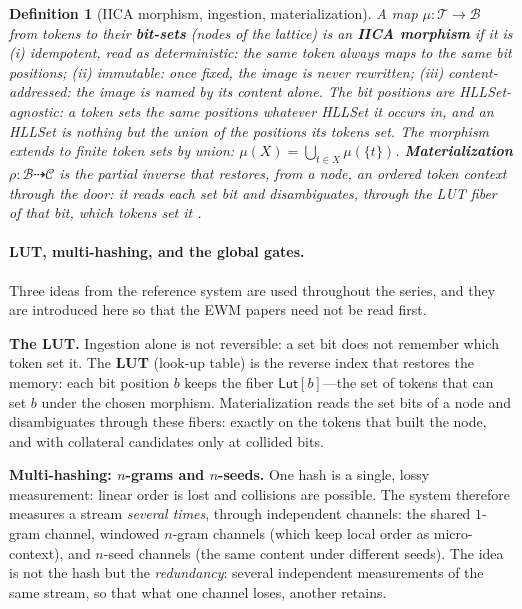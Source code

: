 \documentclass[11pt,a4paper]{article}
\newtheorem{definition}[principle]{Definition}
\theoremstyle{remark}
\newcommand{\Lat}{\ensuremath{\mathcal{B}}}              %
\newcommand{\Tok}{\ensuremath{\mathcal{T}}}              %
\newcommand{\Ctx}{\ensuremath{\mathcal{C}}}              %
\newcommand{\Ing}{\ensuremath{\mu}}                      %
\newcommand{\Mat}{\ensuremath{\rho}}                     %
\newcommand{\Lut}{\ensuremath{\mathsf{Lut}}}             %
\begin{document}
\begin{definition}[IICA morphism, ingestion, materialization]
\label{def:iica}
A map $\Ing : \Tok \to \Lat$ from tokens to their \textbf{bit-sets} (nodes of
the lattice) is an \textbf{IICA
morphism} if it is (i) \emph{idempotent}, read as deterministic: the same token
always maps to the same bit positions; (ii) \emph{immutable}: once fixed, the
image is never rewritten; (iii) \emph{content-addressed}: the image is named by
its content alone. The bit positions are \emph{HLLSet-agnostic}: a token sets
the same positions whatever HLLSet it occurs in, and an HLLSet is nothing but
the union of the positions its tokens set. The morphism extends to finite
token sets by union:
$\Ing(X) = \bigcup_{t \in X} \Ing(\{t\})$. \textbf{Materialization}
$\Mat : \Lat \dashrightarrow \Ctx$ is the partial inverse that restores, from a
node, an ordered token context through the door: it reads each set bit and
disambiguates, through the LUT fiber of that bit, which tokens set it
\cite{attention2026}.
\end{definition}

\paragraph{LUT, multi-hashing, and the global gates.}
Three ideas from the reference system are used throughout the series, and
they are introduced here so that the EWM papers need not be read first.

\textbf{The LUT.} Ingestion alone is not reversible: a set bit does not
remember which token set it. The \textbf{LUT} (look-up table) is the reverse
index that restores the memory: each bit position $b$ keeps the fiber
$\Lut[b]$---the set of tokens that can set $b$ under the chosen morphism.
Materialization reads the set bits of a node and disambiguates through these
fibers: exactly on the tokens that built the node, and with collateral
candidates only at collided bits.

\textbf{Multi-hashing: $n$-grams and $n$-seeds.} One hash is a single, lossy
measurement: linear order is lost and collisions are possible. The system
therefore measures a stream \emph{several times}, through independent
channels: the shared $1$-gram channel, windowed $n$-gram channels (which keep
local order as micro-context), and $n$-seed channels (the same content under
different seeds). The idea is not the hash but the \emph{redundancy}: several
independent measurements of the same stream, so that what one channel loses,
another retains.
\end{document}

